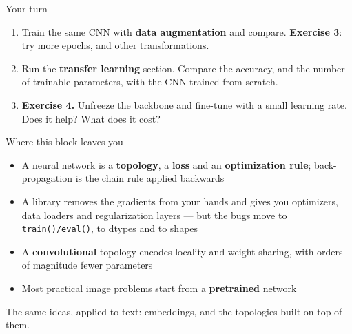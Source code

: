 \documentclass[aspectratio=169,10pt]{beamer}
\begin{document}
\begin{frame}{Your turn}
\begin{practice}
\begin{enumerate}
  \item Train the same CNN with \textbf{data augmentation} and compare.
        \textbf{Exercise 3}: try more epochs, and other transformations.
  \item Run the \textbf{transfer learning} section. Compare the accuracy, and the number
        of trainable parameters, with the CNN trained from scratch.
  \item \textbf{Exercise 4.} Unfreeze the backbone and fine-tune with a small learning
        rate. Does it help? What does it cost?
\end{enumerate}
\end{practice}
\end{frame}

\begin{frame}{Where this block leaves you}
\begin{itemize}
  \item A neural network is a \textbf{topology}, a \textbf{loss} and an
        \textbf{optimization rule}; back-propagation is the chain rule applied backwards
  \item A library removes the gradients from your hands and gives you optimizers, data
        loaders and regularization layers --- but the bugs move to \texttt{train()/eval()},
        to dtypes and to shapes
  \item A \textbf{convolutional} topology encodes locality and weight sharing, with orders
        of magnitude fewer parameters
  \item Most practical image problems start from a \textbf{pretrained} network
\end{itemize}
\vspace{.5em}
\begin{keybox}[Next]
The same ideas, applied to text: embeddings, and the topologies built on top of them.
\end{keybox}
\end{frame}
\end{document}
